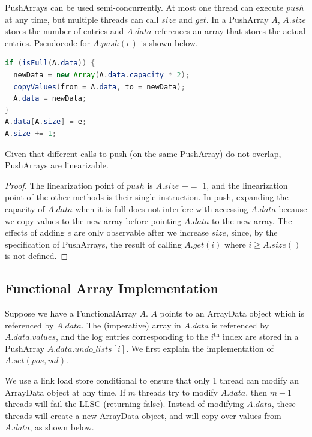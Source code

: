 \documentclass[preprint]{sigplanconf}
\begin{document}
PushArrays can be used semi-concurrently. At most one thread can execute $push$ at any time, but multiple threads can call $size$ and $get$. In a PushArray $A$, $A.size$ stores the number of entries and $A.data$ references an array that stores the actual entries. Pseudocode for $A.push(e)$ is shown below.

\begin{lstlisting}[language=Java]
if (isFull(A.data)) {
  newData = new Array(A.data.capacity * 2);
  copyValues(from = A.data, to = newData);
  A.data = newData;
}
A.data[A.size] = e;
A.size += 1;
\end{lstlisting}

\begin{theorem}
Given that different calls to push (on the same PushArray) do not overlap, PushArrays are linearizable.
\end{theorem}

\begin{proof}
The linearization point of $push$ is $A.size$ $+=$ $1$, and the linearization point of the other methods is their single instruction. In push, expanding the capacity of $A.data$ when it is full does not interfere with accessing $A.data$ because we copy values to the new array before pointing $A.data$ to the new array. The effects of adding $e$ are only observable after we increase $size$, since, by the specification of PushArrays, the result of calling $A.get(i)$ where $i \geq A.size()$ is not defined.
\end{proof}

\subsection{Functional Array Implementation}

Suppose we have a FunctionalArray $A$. $A$ points to an ArrayData object which is referenced by $A.data$. The (imperative) array in $A.data$ is referenced by $A.data.values$, and the log entries corresponding to the $i^{\text{th}}$ index are stored in a PushArray $A.data.undo\_lists[i]$. We first explain the implementation of $A.set(pos, val)$.

We use a link load store conditional to ensure that only 1 thread can modify an ArrayData object at any time. If $m$ threads try to modify $A.data$, then $m-1$ threads will fail the LLSC (returning false). Instead of modifying $A.data$, these threads will create a new ArrayData object, and will copy over values from $A.data$, as shown below.
\end{document}
